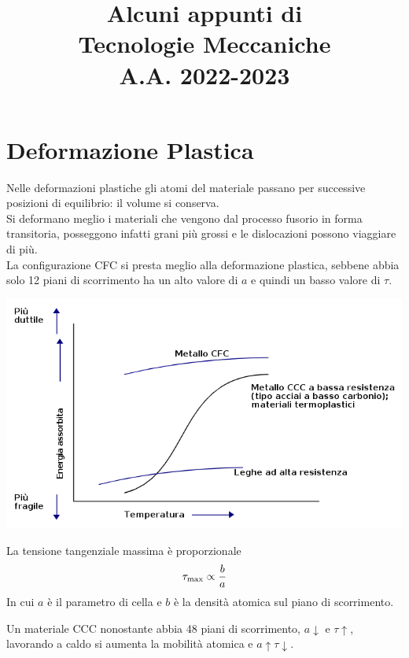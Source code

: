 \documentclass[a4paper, 15pt]{article}
\title{Alcuni appunti di \\
	 Tecnologie Meccaniche\\ {\small A.A. 2022-2023}}
\date{}
\begin{document}
	
	\maketitle
	
	\begin{spacing}{0.85} %
		\tableofcontents
	\end{spacing}
	\newpage
	
	\part{Deformazione Plastica}
	
	Nelle deformazioni plastiche gli atomi del materiale passano per successive posizioni di equilibrio: il volume si conserva. \\
	
	Si deformano meglio i materiali che vengono dal processo fusorio in forma transitoria, posseggono infatti grani più grossi e le dislocazioni possono viaggiare di più. \\
	
	La configurazione CFC si presta meglio alla deformazione plastica, sebbene abbia solo 12 piani di scorrimento ha un alto valore di $a$ e quindi un basso valore di $\tau$.
	\begin{center}		
		\includegraphics[width=0.8\linewidth]{def1}		
	\end{center}
	La tensione tangenziale massima è proporzionale 
\begin{equation}\label{eq:1}
	\tau_{\max}\propto{b\over a}
\end{equation}
	In cui $a$ è il parametro di cella e $b$ è la densità atomica sul piano di scorrimento. 
	
	Un materiale CCC nonostante abbia 48 piani di scorrimento,  $a\downarrow$ e $\tau\uparrow$, lavorando a caldo si aumenta la mobilità atomica e $a\uparrow \tau\downarrow$.
\newpage	
\end{document}
